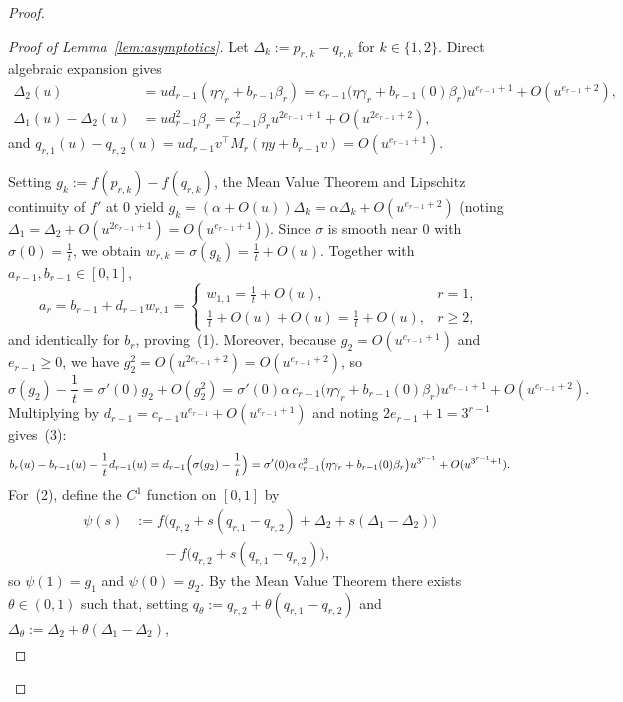 \documentclass[11pt]{article}
\theoremstyle{plain}
\theoremstyle{definition}
\theoremstyle{remark}
\begin{document}
\begin{proof}
\begin{proof}[Proof of Lemma~\ref{lem:asymptotics}]
Let $\Delta_k := p_{r,k} - q_{r,k}$ for $k \in \{1, 2\}$. Direct algebraic expansion gives
\begin{align*}
\Delta_2(u) &= u d_{r-1}(\eta \gamma_r + b_{r-1}\beta_r)
= c_{r-1}\bigl(\eta\gamma_r + b_{r-1}(0)\beta_r\bigr) u^{e_{r-1}+1} + O(u^{e_{r-1}+2}), \\
\Delta_1(u) - \Delta_2(u) &= u d_{r-1}^2 \beta_r
= c_{r-1}^2 \beta_r u^{2e_{r-1}+1} + O(u^{2e_{r-1}+2}),
\end{align*}
and $q_{r,1}(u) - q_{r,2}(u) = u d_{r-1} v^\top M_r (\eta y + b_{r-1} v) = O(u^{e_{r-1}+1})$.

Setting $g_k := f(p_{r,k}) - f(q_{r,k})$, the Mean Value Theorem and Lipschitz continuity of $f'$ at $0$ yield $g_k = (\alpha + O(u))\Delta_k = \alpha\Delta_k + O(u^{e_{r-1}+2})$ (noting $\Delta_1 = \Delta_2 + O(u^{2e_{r-1}+1}) = O(u^{e_{r-1}+1})$). Since $\sigma$ is smooth near $0$ with $\sigma(0) = \frac{1}{t}$, we obtain $w_{r,k} = \sigma(g_k) = \frac{1}{t} + O(u)$. Together with $a_{r-1}, b_{r-1} \in [0, 1]$,
\[
a_r = b_{r-1} + d_{r-1} w_{r,1} = \begin{cases}
w_{1,1} = \frac{1}{t} + O(u), & r = 1, \\
\frac{1}{t} + O(u) + O(u) = \frac{1}{t} + O(u), & r \ge 2,
\end{cases}
\]
and identically for $b_r$, proving~(1). Moreover, because $g_2 = O(u^{e_{r-1}+1})$ and $e_{r-1} \ge 0$, we have $g_2^2 = O(u^{2e_{r-1}+2}) = O(u^{e_{r-1}+2})$, so
\[
\sigma(g_2) - \frac{1}{t}
= \sigma'(0) g_2 + O(g_2^2)
= \sigma'(0)\alpha\, c_{r-1}\bigl(\eta\gamma_r + b_{r-1}(0)\beta_r\bigr) u^{e_{r-1}+1} + O(u^{e_{r-1}+2}).
\]
Multiplying by $d_{r-1} = c_{r-1}u^{e_{r-1}} + O(u^{e_{r-1}+1})$ and noting $2e_{r-1} + 1 = 3^{r-1}$ gives~(3):
\[
b_r(u) - b_{r-1}(u) - \frac{1}{t} d_{r-1}(u)
= d_{r-1}\Bigl(\sigma(g_2) - \frac{1}{t}\Bigr)
= \sigma'(0)\alpha\, c_{r-1}^2\bigl(\eta\gamma_r + b_{r-1}(0)\beta_r\bigr) u^{3^{r-1}} + O(u^{3^{r-1}+1}).
\]
For~(2), define the $C^1$ function on $[0, 1]$ by
\begin{align*}
\psi(s) &:= f\bigl(q_{r,2} + s(q_{r,1} - q_{r,2}) + \Delta_2 + s(\Delta_1 - \Delta_2)\bigr) \\
        &\qquad - f\bigl(q_{r,2} + s(q_{r,1} - q_{r,2})\bigr),
\end{align*}
so $\psi(1) = g_1$ and $\psi(0) = g_2$. By the Mean Value Theorem there exists $\theta \in (0, 1)$ such that, setting $q_\theta := q_{r,2} + \theta(q_{r,1} - q_{r,2})$ and $\Delta_\theta := \Delta_2 + \theta(\Delta_1 - \Delta_2)$,
\begin{align*}

\end{align*}
\end{proof}
\end{proof}
\end{document}
